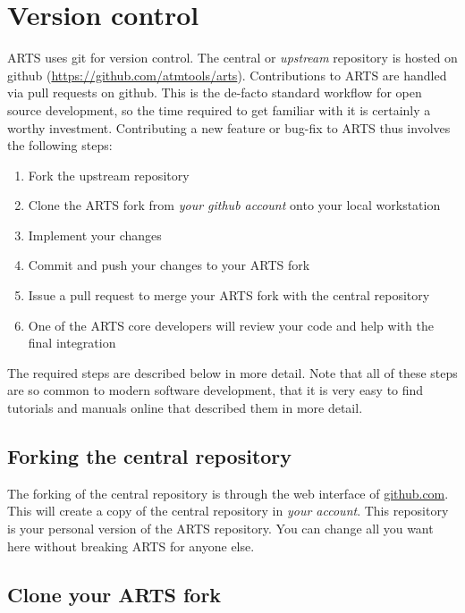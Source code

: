 \section{Version control}
\label{sec:development:cvs}

ARTS uses git for version control. The central or \textit{upstream} repository
is hosted on github (\url{https://github.com/atmtools/arts}). Contributions to
ARTS are handled via pull requests on github. This is the de-facto standard
workflow for open source development, so the time required to get familiar with
it is certainly a worthy investment. Contributing a new feature or bug-fix to
ARTS thus involves the following steps:

\begin{enumerate}
\item Fork the upstream repository
\item Clone the ARTS fork from \textit{your github account} onto your local
  workstation
\item Implement your changes
\item Commit and push your changes to your ARTS fork
\item Issue a pull request to merge your ARTS fork with the central repository
\item One of the ARTS core developers will review your code and help with the
  final integration
\end{enumerate}


The required steps are described below in more detail. Note that all of these
steps are so common to modern software development, that it is very easy to find
tutorials and manuals online that described them in more detail.


\subsection{Forking the central repository}

The forking of the central repository is through the web interface of
\url{github.com}. This will create a copy of the central repository in
\textit{your account}. This repository is your personal version of the ARTS
repository. You can change all you want here without breaking ARTS for anyone
else.

\subsection{Clone your ARTS fork}

